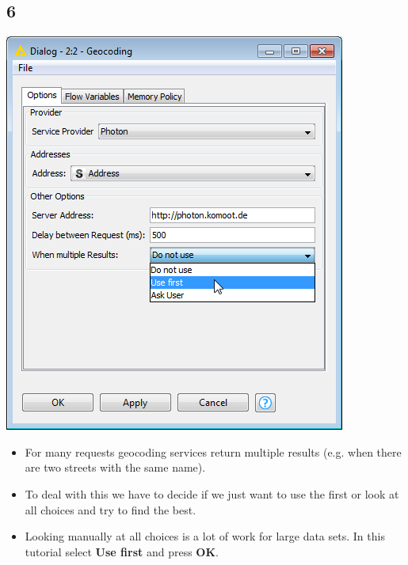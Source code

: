 \documentclass{beamer}
\begin{document}
\subsection{6}
\begin{frame}
	\begin{center}
  		\includegraphics[height=0.5\textheight]{6.png}
	\end{center}
	\begin{itemize}
		\item For many requests geocoding services return multiple results (e.g. when there are two streets with the same name).
		\item To deal with this we have to decide if we just want to use the first or look at all choices and try to find the best.
		\item Looking manually at all choices is a lot of work for large data sets. In this tutorial select \textbf{Use first} and press \textbf{OK}.
	\end{itemize}
\end{frame}
\end{document}
